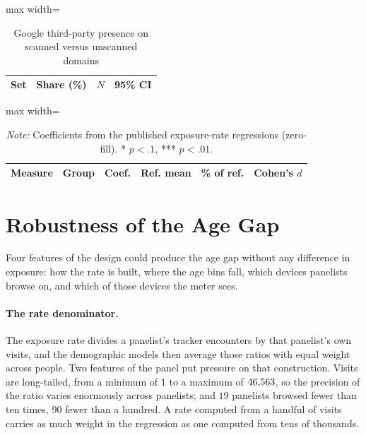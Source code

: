 \documentclass[12pt, letterpaper]{article}
\begin{document}
\begin{table}[ht]
\centering
\caption{Google third-party presence on scanned versus unscanned domains}
\label{tab:implications_google_reach_audit}
\begin{adjustbox}{max width=\textwidth}
\begin{tabular}{lrrc}
\toprule
Set & Share (\%) & $N$ & 95\% CI \\
\midrule

\bottomrule
\end{tabular}
\end{adjustbox}
\end{table}

\begin{table}[ht]
\centering
\caption{Demographic gaps in exposure rates as shares of the reference mean and effect sizes}
\label{tab:implications_gap_benchmarks}
\begin{adjustbox}{max width=\textwidth}
\begin{tabular}{llrrrr}
\toprule
Measure & Group & Coef. & Ref. mean & \% of ref. & Cohen's $d$ \\
\midrule

\bottomrule
\end{tabular}
\end{adjustbox}
\caption*{\textit{Note:} Coefficients from the published exposure-rate regressions (zero-fill). * $p<.1$, *** $p<.01$.}
\end{table}

\section{Robustness of the Age Gap}
\label{sm:robustness}
 
Four features of the design could produce the age gap without any difference in exposure: how the rate is built, where the age bins fall, which devices panelists browse on, and which of those devices the meter sees.
 
\paragraph{The rate denominator.} The exposure rate divides a panelist's tracker encounters by that panelist's own visits, and the demographic models then average those ratios with equal weight across people. Two features of the panel put pressure on that construction. Visits are long-tailed, from a minimum of $1$ to a maximum of $46{,}563$, so the precision of the ratio varies enormously across panelists; and $19$ panelists browsed fewer than ten times, $90$ fewer than a hundred. A rate computed from a handful of visits carries as much weight in the regression as one computed from tens of thousands.
 
\end{document}
